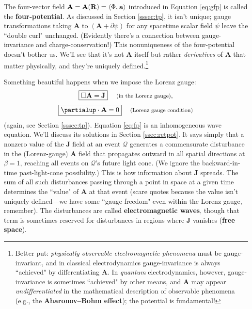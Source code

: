 \documentclass[12pt]{article}
\renewcommand{\vv}[1]{\mathbf{#1}}
\begin{document}
The four-vector field ${\vv A = \vv A (\vv R) = \langle \Phi, \mkern1mu \vv a \rangle}$ introduced in Equation \ref{eq:gfp} is called the \textbf{four-potential}. As discussed in Section \ref{sssec:tp}, it isn't unique; gauge transformations taking $\vv A$ to $(\vv A + \partialup \psi)$ for any spacetime scalar field $\psi$ leave the ``double curl" unchanged. (Evidently there's a connection between gauge-invariance and charge-conservation!) This nonuniqueness of the four-potential doesn't bother us. We'll see that it's not $\vv A$ itself but rather \emph{derivatives} of $\vv A$ that matter physically, and they're uniquely defined.\footnote{Better put: \emph{physically observable electromagnetic phenomena} must be gauge-invariant, and in classical electrodynamics gauge-invariance is always ``achieved" by differentiating $\vv A$. In \emph{quantum} electrodynamics, however, gauge-invariance is sometimes ``achieved" by other means, and $\vv A$ may appear \emph{undifferentiated} in the mathematical description of observable phenomena (e.g., the \textbf{Aharonov--Bohm effect}); the potential is fundamental!}

Something beautiful happens when we impose the Lorenz gauge:
\begin{equation}\label{eq:fp}
\boxed{ \Box \vv A = \vv J } \quad \textrm{\footnotesize{ (in the Lorenz gauge)}} ,
\end{equation}
\begin{equation}\label{eq:lg}
\boxed{ \partialup \cdot \vv A = 0 } \quad \textrm{\footnotesize{ (Lorenz gauge condition)}}
\end{equation}
(again, see Section \ref{sssec:tp}). Equation \ref{eq:fp} is an inhomogeneous wave equation. We'll discuss its solutions in Section \ref{ssec:retpot}. It says simply that a nonzero value of the $\vv J$ field at an event $\mathcal{Q}$ generates a commensurate disturbance in the (Lorenz-gauge) $\vv A$ field that propagates outward in all spatial directions at $\beta = 1$, reaching all events on $\mathcal{Q}$'s future light cone. (We ignore the backward-in-time past-light-cone possibility.) This is how information about $\vv J$ spreads. The sum of all such disturbances passing through a point in space at a given time determines the ``value" of $\vv A$ at that event (scare quotes because the value isn't uniquely defined---we have some ``gauge freedom" even within the Lorenz gauge, remember). The disturbances are called \textbf{electromagnetic waves}, though that term is sometimes reserved for disturbances in regions where $\vv J$ vanishes (\textbf{free space}).
\end{document}
